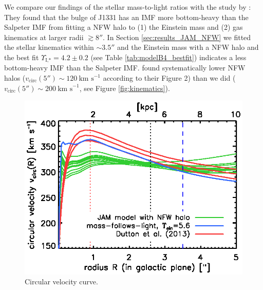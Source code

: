 We compare our findings of the stellar mass-to-light ratios with the study by \cite{SWELLSV}: They found that the bulge of J1331 has an IMF more bottom-heavy than the Salpeter IMF from fitting a NFW halo to (1) the Einstein mass and (2) gas kinematics at larger radii $\gtrsim 8''$. In Section \ref{sec:results_JAM_NFW} we fitted the stellar kinematics within $\sim 3.5''$ and the Einstein mass with a NFW halo and the best fit $\Upsilon_\text{I,*} = 4.2 \pm 0.2$ (see Table \ref{tab:modelB4_bestfit}) indicates a less bottom-heavy IMF than the Salpeter IMF. \cite{SWELLSV}  found systematically lower NFW halos ($v_\text{circ}(5'') \sim 120~\text{km s}^{-1}$ according to their Figure 2) than we did ($v_\text{circ}(5'') \sim 200~\text{km s}^{-1}$, see Figure \ref{fig:kinematics}).

\begin{figure}
\centering
  \includegraphics[width=0.9\linewidth]{fig/B4_jam_profiles_errors_short_vcirc.ps}
  \caption{Circular velocity curve. }
  \label{fig:modelB4_vcirc}
\end{figure}

